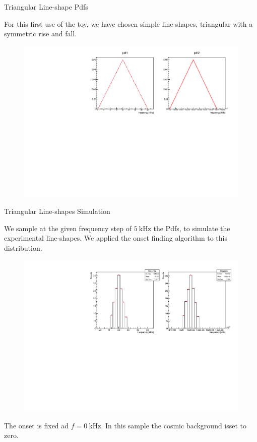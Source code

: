 \documentclass[8pt]{beamer}
\begin{document}
\begin{frame}{Triangular Line-shape Pdfs}

For this first use of the toy, we have chosen simple line-shapes, triangular with a symmetric rise and fall.

\begin{figure}
\centering
\includegraphics[width = \textwidth]{../Plot/Pdf1Pdf2.pdf}
\end{figure}

\end{frame}

\begin{frame}{Triangular Line-shapes Simulation}

We sample at the given frequency step of $\SI{5}{ \kilo \hertz}$ the Pdfs, to simulate the experimental line-shapes. We applied the onset finding algorithm to this distribution.
 
\begin{figure}
\includegraphics[width = \textwidth]{TriangleLineShape.pdf}
\end{figure}

The onset is fixed ad $f = \SI{0}{\kilo \hertz}$. In this sample the cosmic background is\newline set to zero.

\end{frame}
\end{document}
